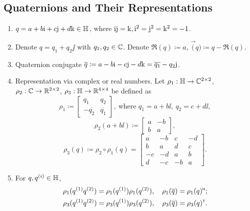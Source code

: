 \subsection{Quaternions and Their Representations}
\label{sec:quaternions}
\begin{enumerate}
    \item $q=a+b{\mathrm{i}} +c{\mathrm{j}} +d{\mathrm{k}} \in \mathbb{H}$, where ${\mathrm{i}} {\mathrm{j}} = {\mathrm{k}}, {\mathrm{i}}^2={\mathrm{j}}^2={\mathrm{k}}^2=-1$. 
    \item Denote $q = q_1 + q_2 \jj$ with $q_1,q_2 \in \mathbb{C}$. Denote $\Re (q) \coloneqq a$, $\Vec (q) \coloneqq q-\Re(q)$. 
    \item Quaternion conjugate $\overline{q}\coloneqq a - b{\mathrm{i}} -c{\mathrm{j}} -d{\mathrm{k}} = \overline{q_1} -q_2 {\mathrm{j}}$. 
    \item Representation via complex or real numbers. Let $\rho_1: \mathbb{H} \to \mathbb{C}^{2\times 2}$, $\rho_2: \mathbb{C} \to \mathbb{R}^{2\times 2}$, $\rho_3: \mathbb{H} \to \mathbb{R}^{4\times 4}$ be defined as
    \[ \rho_1 \coloneqq \begin{bmatrix}
        q_1 & q_2 \\
        -\overline{q_2} & \overline{q_1}
    \end{bmatrix},\ \text{where } q_1=a+b\ii,\ q_2=c+d\ii, \]
    \[ \rho_2(a+b\ii) \coloneqq \begin{bmatrix}
        a & -b \\ b & a
    \end{bmatrix}, \]
    \[ \rho_3(q) \coloneqq \rho_2 \circ \rho_1 (q) = \begin{bmatrix}
        a & -b & c & -d \\
        b & a & d & c \\
        -c & -d & a & b \\
        d & -c & -b & a
    \end{bmatrix}. \]
    \item For $q,q^{(i)}\in \mathbb{H}$,
    \begin{align*}
        \rho_1(q^{(1)} q^{(2)}) = \rho_1(q^{(1)}) \rho_1(q^{(2)}), \quad \rho_1 (\overline{q}) = \rho_1(q)^{\scriptscriptstyle\mathsf{H}} ; \\
        \rho_3(q^{(1)} q^{(2)}) = \rho_3(q^{(1)}) \rho_3(q^{(2)}), \quad \rho_3 (\overline{q}) = \rho_3(q)^{\scriptscriptstyle\mathsf{T}}.
    \end{align*}
\end{enumerate}
 
